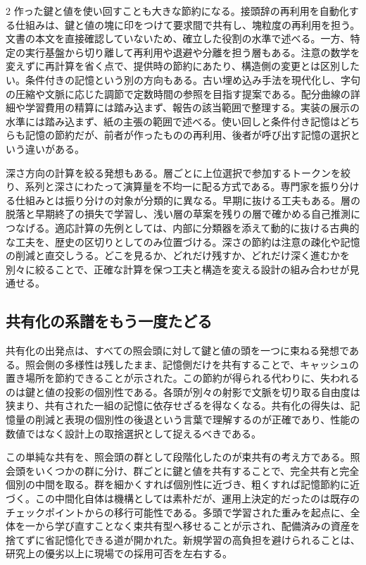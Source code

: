 \documentclass[lualatex,a4paper,10pt]{jlreq}
\begin{document}
\begin{multicols}{2}
作った鍵と値を使い回すことも大きな節約になる。接頭辞の再利用を自動化する仕組みは、鍵と値の塊に印をつけて要求間で共有し、塊粒度の再利用を担う\autocite{vllmprefix}。文書の本文を直接確認していないため、確立した役割の水準で述べる。一方、特定の実行基盤から切り離して再利用や退避や分離を担う層もある\autocite{lmcache}。注意の数学を変えずに再計算を省く点で、提供時の節約にあたり、構造側の変更とは区別したい。条件付きの記憶という別の方向もある。古い埋め込み手法を現代化し、字句の圧縮や文脈に応じた調節で定数時間の参照を目指す提案である\autocite{engram}。配分曲線の詳細や学習費用の精算には踏み込まず、報告の該当範囲で整理する。実装の展示の水準には踏み込まず、紙の主張の範囲で述べる。使い回しと条件付き記憶はどちらも記憶の節約だが、前者が作ったものの再利用、後者が呼び出す記憶の選択という違いがある。

深さ方向の計算を絞る発想もある。層ごとに上位選択で参加するトークンを絞り、系列と深さにわたって演算量を不均一に配る方式である\autocite{mod}。専門家を振り分ける仕組みとは振り分けの対象が分類的に異なる。早期に抜ける工夫もある。層の脱落と早期終了の損失で学習し、浅い層の草案を残りの層で確かめる自己推測につなげる\autocite{layerskip}。適応計算の先例としては、内部に分類器を添えて動的に抜ける古典的な工夫を、歴史の区切りとしてのみ位置づける\autocite{deebert}。深さの節約は注意の疎化や記憶の削減と直交しうる。どこを見るか、どれだけ残すか、どれだけ深く進むかを別々に絞ることで、正確な計算を保つ工夫と構造を変える設計の組み合わせが見通せる。

\subsection{共有化の系譜をもう一度たどる}
共有化の出発点は、すべての照会頭に対して鍵と値の頭を一つに束ねる発想である。照会側の多様性は残したまま、記憶側だけを共有することで、キャッシュの置き場所を節約できることが示された\autocite{mqa}。この節約が得られる代わりに、失われるのは鍵と値の投影の個別性である。各頭が別々の射影で文脈を切り取る自由度は狭まり、共有された一組の記憶に依存せざるを得なくなる。共有化の得失は、記憶量の削減と表現の個別性の後退という言葉で理解するのが正確であり、性能の数値ではなく設計上の取捨選択として捉えるべきである。

この単純な共有を、照会頭の群として段階化したのが束共有の考え方である。照会頭をいくつかの群に分け、群ごとに鍵と値を共有することで、完全共有と完全個別の中間を取る\autocite{gqa}。群を細かくすれば個別性に近づき、粗くすれば記憶節約に近づく。この中間化自体は機構としては素朴だが、運用上決定的だったのは既存のチェックポイントからの移行可能性である。多頭で学習された重みを起点に、全体を一から学び直すことなく束共有型へ移せることが示され、配備済みの資産を捨てずに省記憶化できる道が開かれた\autocite{gqa}。新規学習の高負担を避けられることは、研究上の優劣以上に現場での採用可否を左右する。


\end{multicols}
\end{document}
